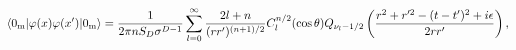 \begin{equation}
\langle 0_{{\rm m}}|\varphi (x)\varphi (x^{\prime })|0_{{\rm
m}}\rangle = \frac{1}{2\pi nS_{D}\sigma ^{D-1}}\sum_{l=0}^{\infty
}\frac{2l+n}{(rr^{\prime })^{(n+1)/2} }C_{l}^{n/2}(\cos \theta
)Q_{\nu _{l} -1/2}\left( \frac{r^{2}+r^{\prime 2}-(t-t^{\prime
})^{2}+i\epsilon }{2rr^{\prime }}\right) , \label{Mink1}
\end{equation}

